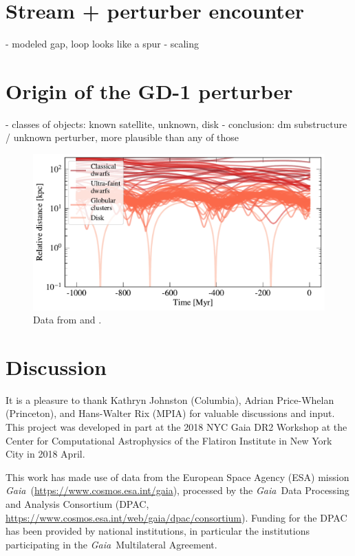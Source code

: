 \documentclass[12pt, modern]{aastex62}
\newcommand{\acronym}[1]{{\small{#1}}}
\newcommand{\Gaia}{\textsl{Gaia}}
\begin{document}
\section{Stream + perturber encounter}
\label{sec:model}
- modeled gap, loop looks like a spur
- scaling

\section{Origin of the GD-1 perturber}
\label{sec:origin}
- classes of objects: known satellite, unknown, disk
- conclusion: dm substructure / unknown perturber, more plausible than any of those

\begin{figure}
\begin{center}
\includegraphics[width=\textwidth]{satellite_distances.pdf}
\end{center}
\caption{Data from \citet{simon2018} and \citet{gdr2_satellites}.}
\label{fig:known_encounters}
\end{figure}

\section{Discussion}

\acknowledgements
It is a pleasure to thank
  Kathryn Johnston (Columbia),
  Adrian Price-Whelan (Princeton),
  and
  Hans-Walter Rix (MPIA)
for valuable discussions and input.
This project was developed in part at the
2018 NYC Gaia DR2 Workshop at the Center for Computational Astrophysics of
the Flatiron Institute in New York City in 2018 April.

This work has made use of data from the European Space Agency (ESA) mission
\Gaia\ (\url{https://www.cosmos.esa.int/gaia}), processed by the \Gaia\ Data
Processing and Analysis Consortium (\acronym{DPAC},
\url{https://www.cosmos.esa.int/web/gaia/dpac/consortium}). Funding for the
\acronym{DPAC}
has been provided by national institutions, in particular the institutions
participating in the \Gaia\ Multilateral Agreement.



\end{document}
